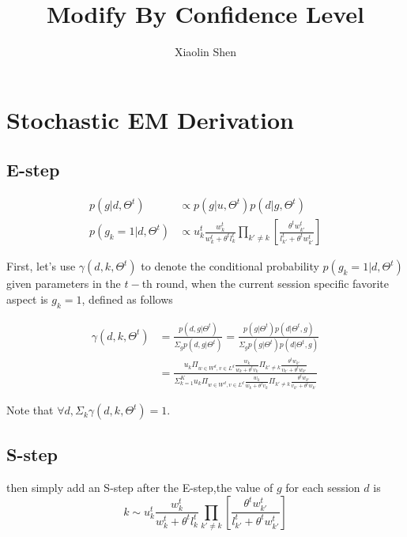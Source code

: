\documentclass{article}
\title{Modify By Confidence Level}
\author{Xiaolin Shen}
\begin{document}
 

\maketitle


\section{Stochastic EM Derivation}

\subsection{E-step}
\begin{eqnarray}
p(g|d,\Theta^{t}) & \propto   p(g|u,\Theta^{t}) p(d|g,\Theta^{t}) \\ \nonumber
 p(g_k=1|d,\Theta^{t}) & \propto  u_k^{t} \frac{w_{k}^t} {w_{k}^t+\theta^t l_{k}^t} \prod_{k'\neq k}  [\frac{\theta^t w_{k'}^t} {l_{k'}^t + \theta^t w_{k'}^t}]
\end{eqnarray}

First, let's use $\gamma(d,k,\Theta^t)$ to denote the conditional probability $p(g_k=1|d,\Theta^t)$ given parameters in the $t-$th round, when the current session specific favorite aspect is $g_k=1$, defined as follows

\begin{align}\label{equ:conditional}
\gamma(d,k,\Theta^t) &=\frac{p(d,g|\Theta^t)}{\Sigma_g p(d,g|\Theta^t)} = \frac{p(g|\Theta^t)p(d|\Theta^t,g)}{\Sigma_g p(g|\Theta^t)p(d|\Theta^t,g)}\\\nonumber
&=\frac{u_k \Pi_{w \in W^d, v\in L^d} \frac{w_k}{w_k+\theta^t v_k}\Pi_{k'\neq k}\frac{\theta^t w_{k'}}{v_{k'}+\theta^t w_{k'}}}{\Sigma_{k=1}^K u_k \Pi_{w \in W^d, v\in L^d} \frac{w_k}{w_k+\theta^t v_k}\Pi_{k'\neq k}\frac{\theta^t w_{k'}}{v_{k'}+\theta^t w_{k'}}}
\end{align}

Note that $\forall d, \Sigma_k \gamma(d,k,\Theta^t)=1$.



\subsection{S-step}
then simply add an S-step after the E-step,the value of $g$ for each session $d$ is
 \begin{equation}
 k \sim u_k^{t} \frac{w_{k}^t} {w_{k}^t+\theta^t l_{k}^t} \prod_{k'\neq k}  [\frac{\theta^t w_{k'}^t} {l_{k'}^t + \theta^t w_{k'}^t}]
 \end{equation}
\end{document}
